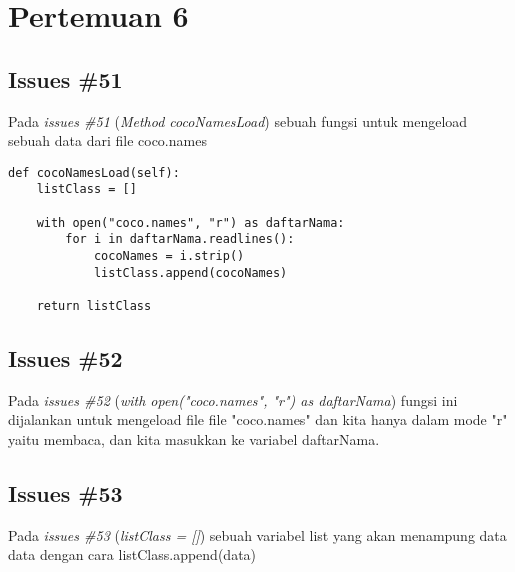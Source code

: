 \chapter{Pertemuan 6}

\section{Issues \#51}
Pada \textit{issues \#51} (\textit{Method cocoNamesLoad}) sebuah fungsi untuk mengeload sebuah data dari file coco.names
\begin{verbatim}
def cocoNamesLoad(self):
    listClass = []

    with open("coco.names", "r") as daftarNama:
        for i in daftarNama.readlines():
            cocoNames = i.strip()
            listClass.append(cocoNames)

    return listClass
\end{verbatim}

\section{Issues \#52}
Pada \textit{issues \#52} (\textit{with open("coco.names", "r") as daftarNama}) fungsi ini dijalankan untuk mengeload file file "coco.names" dan kita hanya dalam mode "r" yaitu membaca, dan kita masukkan ke variabel daftarNama.

\section{Issues \#53}
Pada \textit{issues \#53} (\textit{listClass = []}) sebuah variabel list yang akan menampung data data dengan cara listClass.append(data)

